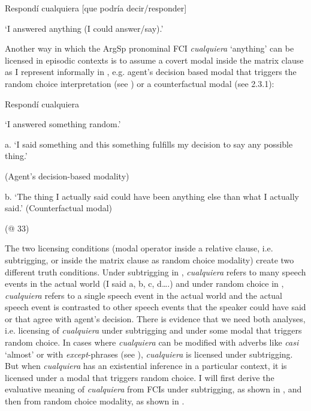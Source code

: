 \label{bkm:Ref63461360}    Respondí cualquiera  [que podría decir/responder]

    ‘I answered anything (I could answer/say).’

Another way in which the ArgSp pronominal FCI \textit{cualquiera} ‘anything’ can be licensed in episodic contexts is to assume a covert modal inside the matrix clause as I represent informally in , e.g. agent’s decision based modal that triggers the random choice interpretation (see ) or a counterfactual modal (see 2.3.1):

\label{bkm:Ref63461220}    Respondí cualquiera

    ‘I answered something random.’

  a.  ‘I said something and this something fulfills my decision to say any possible thing.’ 

(Agent’s decision-based modality)

  b.  ‘The thing I actually said could have been anything else than what I actually said.’ (Counterfactual modal) 

    (@ 33)

The two licensing conditions (modal operator inside a relative clause, i.e. subtrigging, or inside the matrix clause as random choice modality) create two different truth conditions. Under subtrigging in , \textit{cualquiera} refers to many speech events in the actual world (I said a, b, c, d….) and under random choice in , \textit{cualquiera} refers to a single speech event in the actual world and the actual speech event is contrasted to other speech events that the speaker could have said or that agree with agent’s decision. There is evidence that we need both analyses, i.e. licensing of \textit{cualquiera} under subtrigging and under some modal that triggers random choice. In cases where \textit{cualquiera} can be modified with adverbs like \textit{casi} ‘almost’ or with \textit{except}{}-phrases (see ), \textit{cualquiera} is licensed under subtrigging. But when \textit{cualquiera} has an existential inference in a particular context, it is licensed under a modal that triggers random choice. I will first derive the evaluative meaning of \textit{cualquiera} from FCIs under subtrigging, as shown in , and then from random choice modality, as shown in .

